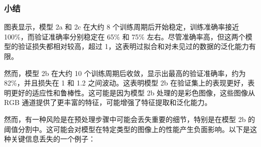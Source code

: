 \subsubsection{小结}
图表显示，模型 2a 和 2c 在大约 8 个训练周期后开始稳定，训练准确率接近 100\%，而验证准确率分别稳定在 65\% 和 75\% 左右。尽管准确率高，但这两个模型的验证损失都相对较高，超过 1，这表明过拟合和对未见过的数据的泛化能力有限。

然而，模型 2b 在大约 10 个训练周期后收敛，显示出最高的验证准确率，约为 82\%，并且损失在 1 和 1.2 之间波动。这表明模型 2b 在验证集上的表现更好，表明更好的适应性和鲁棒性。这可能是因为模型 2b 处理的是彩色图像，这些图像从 RGB 通道提供了更丰富的特征，可能增强了特征提取和泛化能力。

然而，有一种风险是在预处理步骤中可能会丢失重要的细节，特别是在模型 2b 的阈值分割中。这可能会对模型在特定类型的图像上的性能产生负面影响。以下是这种关键信息丢失的一个例子：

